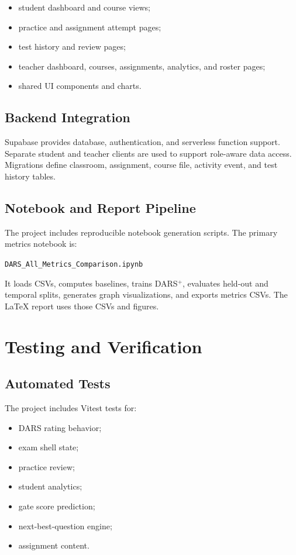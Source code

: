 \documentclass[12pt,a4paper]{report}
\begin{document}
\begin{itemize}[leftmargin=*]
  \item student dashboard and course views;
  \item practice and assignment attempt pages;
  \item test history and review pages;
  \item teacher dashboard, courses, assignments, analytics, and roster pages;
  \item shared UI components and charts.
\end{itemize}

\section{Backend Integration}
Supabase provides database, authentication, and serverless function support. Separate student and teacher clients are used to support role-aware data access. Migrations define classroom, assignment, course file, activity event, and test history tables.

\section{Notebook and Report Pipeline}
The project includes reproducible notebook generation scripts. The primary metrics notebook is:

\begin{center}
\texttt{DARS\_All\_Metrics\_Comparison.ipynb}
\end{center}

It loads CSVs, computes baselines, trains DARS$^+$, evaluates held-out and temporal splits, generates graph visualizations, and exports metrics CSVs. The LaTeX report uses those CSVs and figures.

\chapter{Testing and Verification}
\section{Automated Tests}
The project includes Vitest tests for:

\begin{itemize}[leftmargin=*]
  \item DARS rating behavior;
  \item exam shell state;
  \item practice review;
  \item student analytics;
  \item gate score prediction;
  \item next-best-question engine;
  \item assignment content.
\end{itemize}
\end{document}
